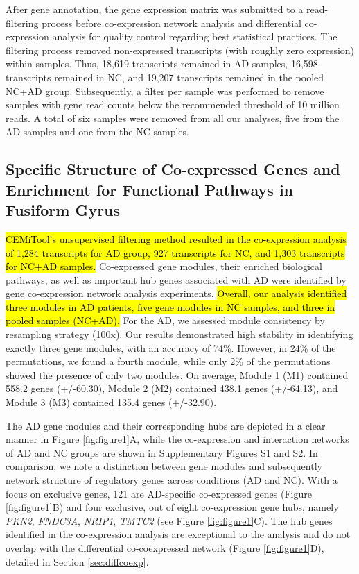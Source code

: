 \documentclass[utf8]{FrontiersinHarvard} %
\begin{document}
After gene annotation, the gene expression matrix was submitted to a read-filtering process before co-expression network analysis and differential co-expression analysis for quality control regarding best statistical practices. The filtering process removed non-expressed transcripts (with roughly zero expression) within samples. Thus, 18,619 transcripts remained in AD samples, 16,598 transcripts remained in NC, and 19,207 transcripts remained in the pooled NC+AD group. Subsequently, a filter per sample was performed to remove samples with gene read counts below the recommended threshold of 10 million reads. A total of six samples were removed from all our analyses, five from the AD samples and one from the NC samples.

\subsection{Specific Structure of Co-expressed Genes and Enrichment for Functional Pathways in Fusiform Gyrus}
\label{sec:pathways}

\hl{CEMiTool's unsupervised filtering method resulted in the co-expression analysis of 1,284 transcripts for AD group, 927 transcripts for NC, and 1,303 transcripts for NC+AD samples.}
Co-expressed gene modules, their enriched biological pathways, as well as important hub genes associated with AD were identified by gene co-expression network analysis experiments. \hl{Overall, our analysis identified three modules in AD patients, five gene modules in NC samples, and three in pooled samples (NC+AD).} For the AD, we assessed module consistency by resampling strategy (100x). Our results demonstrated high stability in identifying exactly three gene modules, with an accuracy of 74\%. However, in 24\% of the permutations, we found a fourth module, while only 2\% of the permutations showed the presence of only two modules. On average, Module 1 (M1) contained 558.2 genes (+/-60.30), Module 2 (M2) contained 438.1 genes (+/-64.13), and Module 3 (M3) contained 135.4 genes (+/-32.90).

The AD gene modules and their corresponding hubs are depicted in a clear manner in Figure \ref{fig:figure1}A, while the co-expression and interaction networks of AD and NC groups are shown in Supplementary Figures S1 and S2. In comparison, we note a distinction between gene modules and subsequently network structure of regulatory genes across conditions (AD and NC). With a focus on exclusive genes, 121 are AD-specific co-expressed genes (Figure \ref{fig:figure1}B) and four exclusive, out of eight co-expression gene hubs, namely \textit{PKN2}, \textit{FNDC3A}, \textit{NRIP1}, \textit{TMTC2} (see Figure \ref{fig:figure1}C). The hub genes identified in the co-expression analysis are exceptional to the analysis and do not overlap with the differential co-coexpressed network (Figure \ref{fig:figure1}D), detailed in Section \ref{sec:diffcoexp}.
\end{document}
